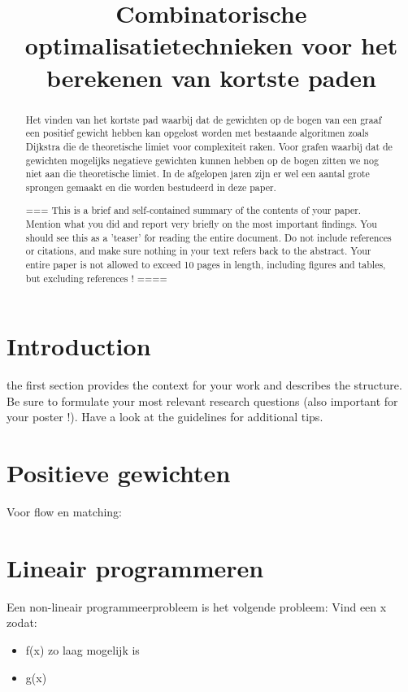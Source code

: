 \documentclass[conference]{IEEEtran}
\begin{document}
\title{Combinatorische optimalisatietechnieken voor het berekenen van kortste paden}

\author{
}

\maketitle

\begin{abstract}
Het vinden van het kortste pad waarbij dat de gewichten op de bogen van een graaf een positief gewicht hebben kan opgelost worden met bestaande algoritmen zoals Dijkstra die de theoretische limiet voor complexiteit raken. Voor grafen waarbij dat de gewichten mogelijks negatieve gewichten kunnen hebben op de bogen zitten we nog niet aan die theoretische limiet. In de afgelopen jaren zijn er wel een aantal grote sprongen gemaakt en die worden bestudeerd in deze paper.

===
This is a brief and self-contained summary of the contents of your paper. Mention what you did and report very briefly on the most important findings. You should see this as a 'teaser' for reading the entire document. Do not include references or citations, and make sure nothing in your text refers back to the abstract. Your entire paper is not allowed to exceed 10 pages in length, including figures and tables, but excluding references !
====
\end{abstract}

\section{Introduction}
the first section provides the context for your work and describes the structure. Be sure to formulate your most relevant research questions (also important for your poster !). Have a look at the guidelines for additional tips.

\section{Positieve gewichten}

Voor flow en matching:
\section{Lineair programmeren}
Een non-lineair programmeerprobleem is het volgende probleem:
Vind een x zodat:
\begin{itemize}
    \item f(x) zo laag mogelijk is
    \item g(x) \beq
\end{itemize}
\end{document}
